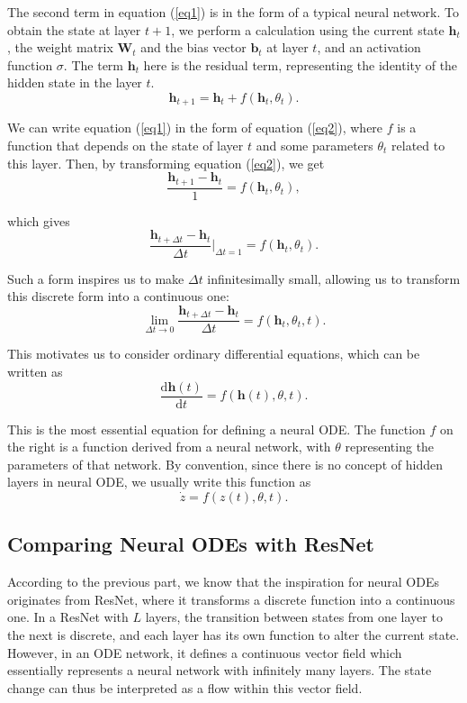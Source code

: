 \documentclass[a4paper,11pt,titlepage]{article}
\theoremstyle{definition}
\theoremstyle{plain}
\theoremstyle{remark}
\begin{document}
The second term in equation (\ref{eq1}) is in the form of a typical neural network. To obtain the state at layer $t+1$, we perform a calculation using the current state $\textbf{h}_t$, the weight matrix $\textbf{W}_t$ and the bias vector $\textbf{b}_t$ at layer $t$, and an activation function $\sigma$. The term $\textbf{h}_t$ here is the residual term, representing the identity of the hidden state in the layer $t$.
\begin{equation}\label{eq2}
    \textbf{h}_{t+1} = \textbf{h}_t + f\left(\textbf{h}_t, \theta_t\right).\tag{2}
\end{equation}

We can write equation (\ref{eq1}) in the form of equation (\ref{eq2}), where $f$ is a function that depends on the state of layer $t$ and some parameters $\theta_t$ related to this layer. Then, by transforming equation (\ref{eq2}), we get
$$\frac{\textbf{h}_{t+1} - \textbf{h}_t}{1}=f\left(\textbf{h}_t, \theta_t\right),$$

which gives
$$\frac{\textbf{h}_{t+\Delta t} - \textbf{h}_t }{\Delta t}\Bigg|_{\Delta t=1}=f\left(\textbf{h}_t, \theta_t\right).$$

Such a form inspires us to make $\Delta t$ infinitesimally small, allowing us to transform this discrete form into a continuous one:
$$\lim_{\Delta t\to 0}\frac{\textbf{h}_{t+\Delta t} - \textbf{h}_t }{\Delta t}= f(\textbf{h}_t, \theta_t,t).$$

This motivates us to consider ordinary differential equations, which can be written as
$$\frac{\mathrm{d}{\textbf{h}}(t)}{\mathrm{d}t}=f(\textbf{h}(t),\theta,t).$$

This is the most essential equation for defining a neural ODE. The function $f$ on the right is a function derived from a neural network, with $\theta$ representing the parameters of that network. By convention, since there is no concept of hidden layers in neural ODE, we usually write this function as
$$\dot{z}=f(z(t),\theta,t).$$

\subsection{Comparing Neural ODEs with ResNet}

According to the previous part, we know that the inspiration for neural ODEs originates from ResNet, where it transforms a discrete function into a continuous one. In a ResNet with $L$ layers, the transition between states from one layer to the next is discrete, and each layer has its own function to alter the current state. However, in an ODE network, it defines a continuous vector field which essentially represents a neural network with infinitely many layers. The state change can thus be interpreted as a flow within this vector field.
\end{document}
